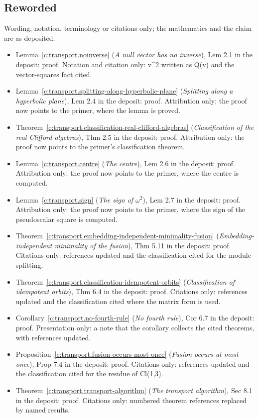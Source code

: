 \documentclass[11pt]{article}
\theoremstyle{definition}
\theoremstyle{plain}
\begin{document}
\subsection*{Reworded}
Wording, notation, terminology or citations only; the mathematics and the claim are as deposited.
\begin{itemize}\setlength{\itemsep}{2pt}
\item Lemma~\ref{c:transport.noinverse} (\emph{A null vector has no inverse}), Lem 2.1 in the deposit: proof. Notation and citation only: v\^{}2 written as Q(v) and the vector-squares fact cited.
\item Lemma~\ref{c:transport.splitting-along-hyperbolic-plane} (\emph{Splitting along a hyperbolic plane}), Lem 2.4 in the deposit: proof. Attribution only: the proof now points to the primer, where the lemma is proved.
\item Theorem~\ref{c:transport.classification-real-clifford-algebras} (\emph{Classification of the real Clifford algebras}), Thm 2.5 in the deposit: proof. Attribution only: the proof now points to the primer's classification theorem.
\item Lemma~\ref{c:transport.centre} (\emph{The centre}), Lem 2.6 in the deposit: proof. Attribution only: the proof now points to the primer, where the centre is computed.
\item Lemma~\ref{c:transport.sign} (\emph{The sign of $\omega^2$}), Lem 2.7 in the deposit: proof. Attribution only: the proof now points to the primer, where the sign of the pseudoscalar square is computed.
\item Theorem~\ref{c:transport.embedding-independent-minimality-fusion} (\emph{Embedding-independent minimality of the fusion}), Thm 5.11 in the deposit: proof. Citations only: references updated and the classification cited for the module splitting.
\item Theorem~\ref{c:transport.classification-idempotent-orbits} (\emph{Classification of idempotent orbits}), Thm 6.4 in the deposit: proof. Citations only: references updated and the classification cited where the matrix form is used.
\item Corollary~\ref{c:transport.no-fourth-rule} (\emph{No fourth rule}), Cor 6.7 in the deposit: proof. Presentation only: a note that the corollary collects the cited theorems, with references updated.
\item Proposition~\ref{c:transport.fusion-occurs-most-once} (\emph{Fusion occurs at most once}), Prop 7.4 in the deposit: proof. Citations only: references updated and the classification cited for the residue of Cl(1,3).
\item Theorem~\ref{c:transport.transport-algorithm} (\emph{The transport algorithm}), Sec 8.1 in the deposit: proof. Citations only: numbered theorem references replaced by named results.
\end{itemize}
\end{document}

